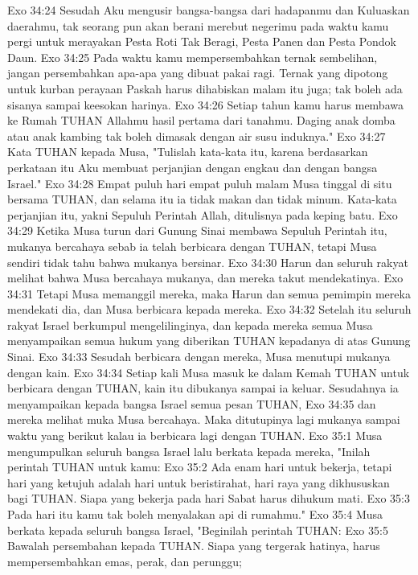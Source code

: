 Exo 34:24  Sesudah Aku mengusir bangsa-bangsa dari hadapanmu dan Kuluaskan daerahmu, tak seorang pun akan berani merebut negerimu pada waktu kamu pergi untuk merayakan Pesta Roti Tak Beragi, Pesta Panen dan Pesta Pondok Daun.
Exo 34:25  Pada waktu kamu mempersembahkan ternak sembelihan, jangan persembahkan apa-apa yang dibuat pakai ragi. Ternak yang dipotong untuk kurban perayaan Paskah harus dihabiskan malam itu juga; tak boleh ada sisanya sampai keesokan harinya.
Exo 34:26  Setiap tahun kamu harus membawa ke Rumah TUHAN Allahmu hasil pertama dari tanahmu. Daging anak domba atau anak kambing tak boleh dimasak dengan air susu induknya."
Exo 34:27  Kata TUHAN kepada Musa, "Tulislah kata-kata itu, karena berdasarkan perkataan itu Aku membuat perjanjian dengan engkau dan dengan bangsa Israel."
Exo 34:28  Empat puluh hari empat puluh malam Musa tinggal di situ bersama TUHAN, dan selama itu ia tidak makan dan tidak minum. Kata-kata perjanjian itu, yakni Sepuluh Perintah Allah, ditulisnya pada keping batu.
Exo 34:29  Ketika Musa turun dari Gunung Sinai membawa Sepuluh Perintah itu, mukanya bercahaya sebab ia telah berbicara dengan TUHAN, tetapi Musa sendiri tidak tahu bahwa mukanya bersinar.
Exo 34:30  Harun dan seluruh rakyat melihat bahwa Musa bercahaya mukanya, dan mereka takut mendekatinya.
Exo 34:31  Tetapi Musa memanggil mereka, maka Harun dan semua pemimpin mereka mendekati dia, dan Musa berbicara kepada mereka.
Exo 34:32  Setelah itu seluruh rakyat Israel berkumpul mengelilinginya, dan kepada mereka semua Musa menyampaikan semua hukum yang diberikan TUHAN kepadanya di atas Gunung Sinai.
Exo 34:33  Sesudah berbicara dengan mereka, Musa menutupi mukanya dengan kain.
Exo 34:34  Setiap kali Musa masuk ke dalam Kemah TUHAN untuk berbicara dengan TUHAN, kain itu dibukanya sampai ia keluar. Sesudahnya ia menyampaikan kepada bangsa Israel semua pesan TUHAN,
Exo 34:35  dan mereka melihat muka Musa bercahaya. Maka ditutupinya lagi mukanya sampai waktu yang berikut kalau ia berbicara lagi dengan TUHAN.
Exo 35:1  Musa mengumpulkan seluruh bangsa Israel lalu berkata kepada mereka, "Inilah perintah TUHAN untuk kamu:
Exo 35:2  Ada enam hari untuk bekerja, tetapi hari yang ketujuh adalah hari untuk beristirahat, hari raya yang dikhususkan bagi TUHAN. Siapa yang bekerja pada hari Sabat harus dihukum mati.
Exo 35:3  Pada hari itu kamu tak boleh menyalakan api di rumahmu."
Exo 35:4  Musa berkata kepada seluruh bangsa Israel, "Beginilah perintah TUHAN:
Exo 35:5  Bawalah persembahan kepada TUHAN. Siapa yang tergerak hatinya, harus mempersembahkan emas, perak, dan perunggu;

